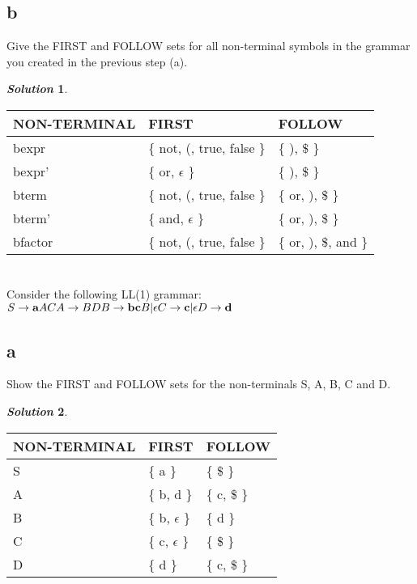 \documentclass[11pt, a4paper]{article}
\newtheorem*{solution}{\emph{Solution}}
\begin{document}
\subsection*{b}
	Give the FIRST and FOLLOW sets for all non-terminal symbols in the grammar you created in the previous step (a).
	\begin{solution}\end{solution}
		\begin{tabular}{|l|l||l|}
		\hline
		NON-TERMINAL & FIRST & FOLLOW\\
		\hline
		bexpr & \{ not, (, true, false \} & \{ ), \$ \}\\
		\hline
		bexpr' & \{ or, $\epsilon$ \} & \{ ), \$ \}\\ 
		\hline
		bterm & \{ not, (, true, false \} & \{ or, ), \$ \}\\
		\hline
		bterm' & \{ and, $\epsilon$ \} & \{ or, ), \$ \}\\
		\hline
		bfactor & \{ not, (, true, false \} & \{ or, ), \$, and \}\\
		\hline
		\end{tabular}

\section{}
Consider the following LL(1) grammar:\\
	$
		S \rightarrow \textbf{a}AC\\
		A \rightarrow BD\\
		B \rightarrow \textbf{bc}B | \epsilon\\
		C \rightarrow \textbf{c} | \epsilon\\
		D \rightarrow \textbf{d}
	$
\subsection*{a}
	Show the FIRST and FOLLOW sets for the non-terminals S, A, B, C and D.
	\begin{solution}\end{solution}
		\begin{tabular}{|l|l||l|}
			\hline
			NON-TERMINAL & FIRST & FOLLOW\\
			\hline
			S & \{ a \} & \{ \$ \}\\
			\hline
			A & \{ b, d \} & \{ c, \$ \}\\
			\hline
			B & \{ b, $\epsilon$ \} & \{ d \}\\
			\hline
			C & \{ c, $\epsilon$ \} & \{ \$ \}\\
			\hline
			D & \{ d \} & \{ c, \$ \}\\
			\hline
		\end{tabular}
\end{document}
